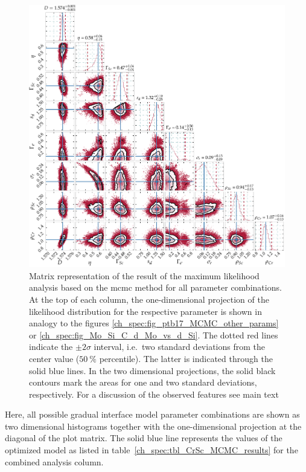 \begin{figure}[htbp]
  \centering
  \includegraphics[width=\textwidth]{img/CrSc_cornerplot_combined}
  \caption[Matrix representation of the result of the maximum likelihood analysis for the Cr/Sc sample.]{Matrix representation of the result of the maximum likelihood analysis based on the \gls{mcmc} method for all parameter combinations. At the top of each column, the one-dimensional projection of the likelihood distribution for the respective parameter is shown in analogy to the figures \ref{ch_spec:fig_ptb17_MCMC_other_params} or \ref{ch_spec:fig_Mo_Si_C_d_Mo_vs_d_Si}. The dotted red lines indicate the $\pm 2 \sigma$ interval, i.e.~two standard deviations from the center value ($\SI{50}{\percent}$ percentile). The latter is indicated through the solid blue lines. In the two dimensional projections, the solid black contours mark the areas for one and two standard deviations, respectively. For a discussion of the observed features see main text}
  \label{ch_spec:fig_CrSc_cornerplot_combined}
\end{figure}
Here, all possible gradual interface model parameter combinations are shown as two dimensional histograms together with the one-dimensional projection at the diagonal of the plot matrix. The solid blue line represents the values of the optimized model as listed in table~\ref{ch_spec:tbl_CrSc_MCMC_results} for the combined analysis column.

